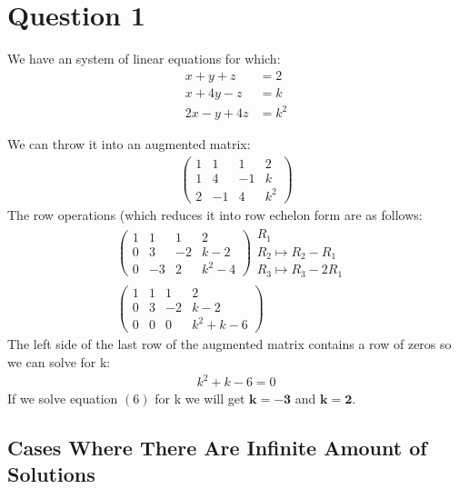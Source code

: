 \documentclass[12pt]{article}
\begin{document}
\pagebreak
\tableofcontents
\pagebreak

\section{Question 1}
We have an system of linear equations for which:
\begin{align}
x+y+z &= 2 \\
x + 4y - z &= k \\
2x-y + 4z &= k^2 
\end{align} 

We can throw it into an augmented matrix:
\begin{align*}
\left(\begin{array}{ccc|c}
1 & 1 & 1 & 2 \\
1 & 4 & -1 & k \\
2 & -1 & 4 & k^2
\end{array}\right)
\end{align*}
The row operations (which reduces it into row echelon form are as follows:
\begin{align}
\left(\begin{array}{ccc|c}
1 & 1 & 1 & 2 \\
0 & 3 & -2 & k-2 \\
0 & -3 & 2 & k^2-4
\end{array}\right)
\begin{array}{l}
  \text{$R_1$}\\
  \text{$R_2 \longmapsto R_2-R_1$}\\
  \text{$R_3 \longmapsto R_3-2R_1$ }
\end{array}
\\
\left(\begin{array}{ccc|c}
1 & 1 & 1 & 2 \\
0 & 3 & -2 & k-2 \\
0 & 0 & 0 & k^2+k-6
\end{array}\right)
\end{align}
The left side of the last row of the augmented matrix contains a row of zeros so we can solve for k:
\begin{align}
 k^2+k-6=0
\end{align}
If we solve equation $(6)$ for k we will get $\bm{k = -3}$ and $\bm{k=2}$.  \\
\newpage
\subsection{Cases Where There Are Infinite Amount of Solutions}
\end{document}
